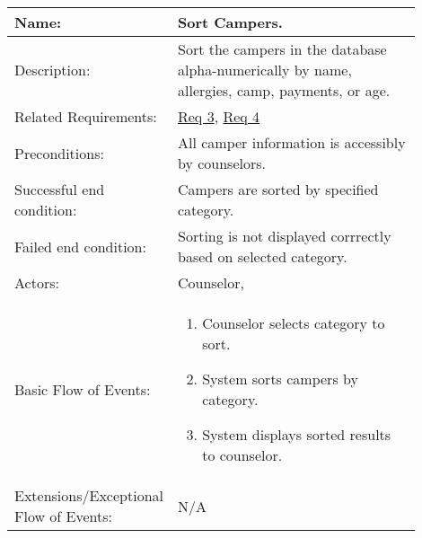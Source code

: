\documentclass[11pt]{article}
\begin{document}
\begin{table}[!htb]
\begin{center}
\begin{tabular}{p{0.30\linewidth}p{0.60\linewidth}}
	Name: & Sort Campers.\\\hline
	Description: & Sort the campers in the database alpha-numerically by name, allergies, camp, payments, or age.\\\hline
	Related Requirements:& \hyperlink{Req3}{Req 3}, \hyperlink{Req4}{Req 4}\\\hline
	Preconditions:& All camper information is accessibly by counselors.\\\hline
	Successful end condition:& Campers are sorted by specified category.\\\hline
	Failed end condition:& Sorting is not displayed corrrectly based on selected category.\\\hline
	Actors:& Counselor,\\\hline
	Basic Flow of Events: & \begin{enumerate}[topsep=0pt]
		\item Counselor selects category to sort.
		\item System sorts campers by category.
		\item System displays sorted results to counselor.
	\end{enumerate}\\\hline
	Extensions/Exceptional Flow of Events: & \vspace*{.25em}  N/A
\end{tabular}
\label{des:sort campers}	
\end{center}
\end{table}

\end{document}
